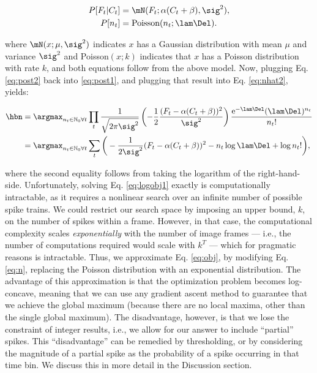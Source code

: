 \begin{subequations} \label{eq:post2}
\begin{align}
P[F_t | C_t] &= \mN(F_t; \alpha(C_t+\beta),\sig^2), \label{eq:lik2} \\
P[n_t] &= \text{Poisson}(n_t; \lam \Del). \label{eq:prior2} 
\end{align}
\end{subequations}

\noindent where $\mN(x;\mu,\sig^2)$ indicates $x$ has a Gaussian distribution with mean $\mu$ and variance $\sig^2$ and Poisson$(x;k)$ indicates that $x$ has a Poisson distribution with rate $k$, and both equations follow from the above model.  Now, plugging Eq. \eqref{eq:post2} back into \eqref{eq:post1}, and plugging that result into Eq. \eqref{eq:nhat2}, yields:

\begin{subequations}  \label{eq:obj}
\begin{align}
\hbn 	&= \anx \prod_t \frac{1}{\sqrt{2 \pi \sig^2}} \left(-\frac{1}{2}\frac{(F_t - \alpha (C_t + \beta))^2}{\sig^2}\right) \frac{\text{e}^{-\lam\Del} (\lam\Del)^{n_t}}{n_t!}
\label{eq:obj1}\\ &= \anx  \sum_t \bigg( -\frac{1}{2 \sig^2}(F_t - \alpha(C_t + \beta))^2  -  n_t \log \lam \Del + \log n_t! \bigg), \label{eq:logobj1}
\end{align} 
\end{subequations}

\noindent where the second equality follows from taking the logarithm of the right-hand-side.  Unfortunately, solving Eq. \eqref{eq:logobj1} exactly is computationally intractable, as it requires a nonlinear search over an infinite number of  possible spike trains.  We could restrict our search space by imposing an upper bound, $k$, on the number of spikes within a frame.  However, in that case, the computational complexity scales \emph{exponentially} with the number of image frames --- i.e., the number of computations required would scale with $k^T$ --- which for pragmatic reasons is intractable.  Thus, we approximate Eq. \eqref{eq:obj}, by modifying Eq. \eqref{eq:n}, replacing the Poisson distribution with an exponential distribution.  The advantage of this approximation is that the optimization problem becomes log-concave, meaning that we can use any gradient ascent method to guarantee that we achieve the global maximum (because there are no local maxima, other than the single global maximum).  The disadvantage, however, is that we lose the constraint of integer results, i.e., we allow for our answer to include ``partial'' spikes.  This ``disadvantage'' can be remedied by thresholding, or by considering the magnitude of a partial spike as the probability of a spike occurring in that time bin.  We discuss this in more detail in the Discussion section. 